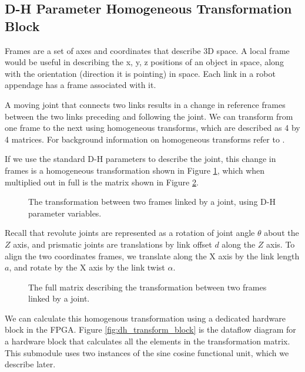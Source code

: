 \subsection{D-H Parameter Homogeneous Transformation Block}

Frames are a set of axes and coordinates that describe 3D space. A local frame would be useful in describing the x, y, z positions of an object in space, along with the orientation (direction it is pointing) in space. Each link in a robot appendage has a frame associated with it.

A moving joint that connects two links results in a change in reference frames between the two links preceding and following the joint. We can transform from one frame to the next using homogeneous transforms, which are described as 4 by 4 matrices. For background information on homogeneous transforms refer to \cite{frames}.

If we use the standard D-H parameters to describe the joint, this change in frames is a homogeneous transformation shown in Figure \ref{fig:dh_transform_equation}, which when multiplied out in full is the matrix shown in Figure \ref{fig:dh_transform_matrix}. 

\begin{figure}[ht]
\center
{}
\caption{The transformation between two frames linked by a joint, using D-H parameter variables.}
\label{fig:dh_transform_equation}
\end{figure}

Recall that revolute joints are represented as a rotation of joint angle $\theta$ about the $Z$ axis, and prismatic joints are translations by link offset $d$ along the $Z$ axis. To align the two coordinates frames, we translate along the X axis by the link length $a$, and rotate by the X axis by the link twist $\alpha$.

\begin{figure}[ht]
\center
{}
\caption{The full matrix describing the transformation between two frames linked by a joint.}
\label{fig:dh_transform_matrix}
\end{figure}

We can calculate this homogenous transformation using a dedicated hardware block in the FPGA. Figure \ref{fig:dh_transform_block} is the dataflow diagram for a hardware block that calculates all the elements in the transformation matrix. This submodule uses two instances of the sine cosine functional unit, which we describe later.

